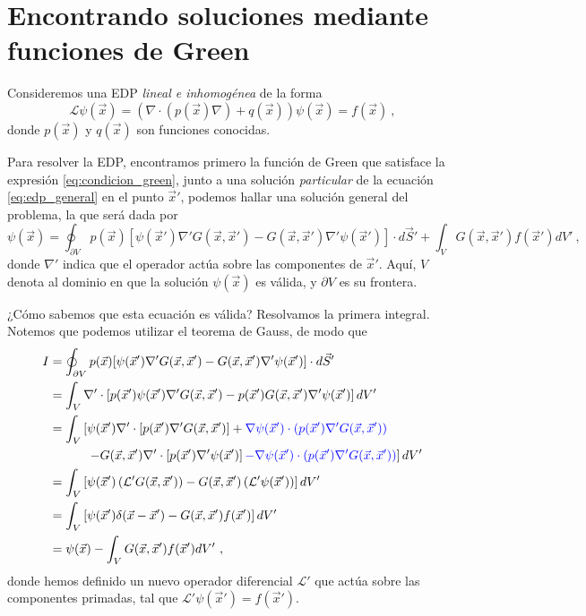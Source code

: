 \section{Encontrando soluciones mediante funciones de Green}

Consideremos una EDP \emph{lineal e inhomogénea} de la forma
\begin{equation}\label{eq:edp_general}
    \mathcal{L} \psi(\vec{x}) = \left(\nabla \cdot (p(\vec{x}) \nabla) + q(\vec{x})\right)\psi(\vec{x}) = f(\vec{x}) \ ,
\end{equation}
donde $p(\vec{x})$ y $q(\vec{x})$ son funciones conocidas.

Para resolver la EDP, encontramos primero la función de Green que satisface la expresión \eqref{eq:condicion_green}, junto a una solución \emph{particular} de la ecuación \eqref{eq:edp_general} en el punto $\vec{x}'$, podemos hallar una solución general del problema, la que será dada por
\begin{equation}\label{eq:solucion_green}
    \psi(\vec{x}) = \oint_{\partial V} p(\vec{x})[\psi(\vec{x}') \nabla' G(\vec{x}, \vec{x}') - G(\vec{x}, \vec{x}') \nabla' \psi(\vec{x}')] \cdot d\vec{S}' + \int_V G(\vec{x}, \vec{x}') f(\vec{x}') dV' \ ,
\end{equation}
donde $\nabla'$ indica que el operador actúa sobre las componentes de $\vec{x}'$. Aquí, $V$ denota al dominio en que la solución $\psi(\vec{x})$ es válida, y $\partial V$ es su frontera.

¿Cómo sabemos que esta ecuación es válida? Resolvamos la primera integral. Notemos que podemos utilizar el teorema de Gauss, de modo que
\begin{align}
    I & = \oint_{\partial V} p(\vec{x})[\psi(\vec{x}') \nabla' G(\vec{x}, \vec{x}') - G(\vec{x}, \vec{x}') \nabla' \psi(\vec{x}')] \cdot d\vec{S}' \label{eq:integral_green_superficie} \\
    & = \int_V \nabla' \cdot \left[ p(\vec{x}') \psi(\vec{x}') \nabla' G(\vec{x}, \vec{x}') - p(\vec{x}') G(\vec{x}, \vec{x}') \nabla' \psi(\vec{x}') \right] dV' \\
    & = \int_V \left[\psi(\vec{x}') \nabla' \cdot \left[ p(\vec{x}')  \nabla' G(\vec{x}, \vec{x}')\right] + \textcolor{blue}{\nabla \psi(\vec{x}') \cdot (p(\vec{x}') \nabla' G(\vec{x}, \vec{x}') )} \right. \nonumber \\
    & \qquad \quad \left. -  G(\vec{x}, \vec{x}') \nabla' \cdot \left[p(\vec{x}') \nabla' \psi(\vec{x}')\right] \textcolor{blue}{- \nabla \psi(\vec{x}') \cdot (p(\vec{x}') \nabla' G(\vec{x}, \vec{x}') )} \right] dV' \\
    & = \int_V \left[ \psi(\vec{x}') \left( \mathcal{L}' G(\vec{x}, \vec{x}') \right) - G(\vec{x}, \vec{x}') \left( \mathcal{L}' \psi(\vec{x}') \right) \right] dV' \\
    & = \int_V \left[ \psi(\vec{x}') \delta(\vec{x} - \vec{x}') - G(\vec{x}, \vec{x}') f(\vec{x}') \right] dV' \\
    & = \psi(\vec{x}) - \int_V G(\vec{x}, \vec{x}') f(\vec{x}') dV' \ ,
\end{align}
donde hemos definido un nuevo operador diferencial $\mathcal{L}'$ que actúa sobre las componentes primadas, tal que $\mathcal{L}' \psi(\vec{x}') = f(\vec{x}')$.

